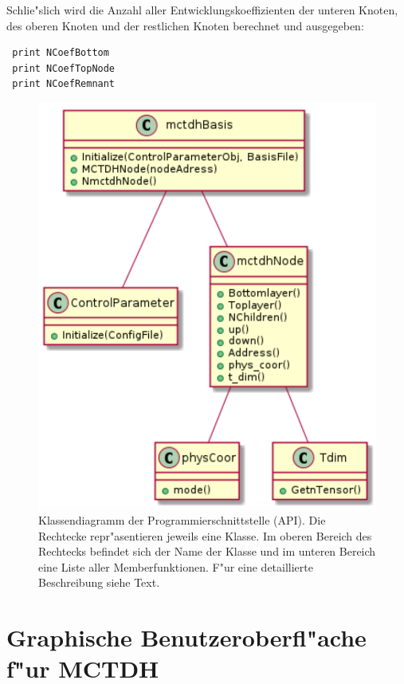 Schlie"slich wird die Anzahl aller Entwicklungskoeffizienten der unteren Knoten, des oberen Knoten
und der restlichen Knoten berechnet und ausgegeben:
\begin{verbatim}
 print NCoefBottom 
 print NCoefTopNode 
 print NCoefRemnant
\end{verbatim}
    
\begin{figure}
    \centering
    \includegraphics[scale=0.6]{figures/sequenceDiagram}
    \caption{Klassendiagramm der Programmierschnittstelle (API). Die Rechtecke repr"asentieren jeweils eine Klasse.
    Im oberen Bereich des Rechtecks befindet sich der Name der Klasse und im unteren Bereich eine Liste aller
    Memberfunktionen. F"ur eine detaillierte Beschreibung siehe Text.}\label{fig:uml_Cython}
\end{figure}



\section{Graphische Benutzeroberfl"ache f"ur MCTDH}

